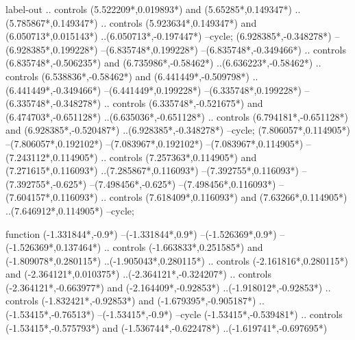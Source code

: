 {\begin{scope}[x=1mm,y=1mm,line width=\SCstroke mm,line cap=round,line join=round]
\begin{SCpart}{label-out}
.. controls ({5.522209*\SCF},{0.019893*\SCF}) and ({5.65285*\SCF},{0.149347*\SCF}) ..({5.785867*\SCF},{0.149347*\SCF})
.. controls ({5.923634*\SCF},{0.149347*\SCF}) and ({6.050713*\SCF},{0.015143*\SCF}) ..({6.050713*\SCF},{-0.197447*\SCF})
--cycle;
 ({6.928385*\SCF},{-0.348278*\SCF})
--({6.928385*\SCF},{0.199228*\SCF})
--({6.835748*\SCF},{0.199228*\SCF})
--({6.835748*\SCF},{-0.349466*\SCF})
.. controls ({6.835748*\SCF},{-0.506235*\SCF}) and ({6.735986*\SCF},{-0.58462*\SCF}) ..({6.636223*\SCF},{-0.58462*\SCF})
.. controls ({6.538836*\SCF},{-0.58462*\SCF}) and ({6.441449*\SCF},{-0.509798*\SCF}) ..({6.441449*\SCF},{-0.349466*\SCF})
--({6.441449*\SCF},{0.199228*\SCF})
--({6.335748*\SCF},{0.199228*\SCF})
--({6.335748*\SCF},{-0.348278*\SCF})
.. controls ({6.335748*\SCF},{-0.521675*\SCF}) and ({6.474703*\SCF},{-0.651128*\SCF}) ..({6.635036*\SCF},{-0.651128*\SCF})
.. controls ({6.794181*\SCF},{-0.651128*\SCF}) and ({6.928385*\SCF},{-0.520487*\SCF}) ..({6.928385*\SCF},{-0.348278*\SCF})
--cycle;
 ({7.806057*\SCF},{0.114905*\SCF})
--({7.806057*\SCF},{0.192102*\SCF})
--({7.083967*\SCF},{0.192102*\SCF})
--({7.083967*\SCF},{0.114905*\SCF})
--({7.243112*\SCF},{0.114905*\SCF})
.. controls ({7.257363*\SCF},{0.114905*\SCF}) and ({7.271615*\SCF},{0.116093*\SCF}) ..({7.285867*\SCF},{0.116093*\SCF})
--({7.392755*\SCF},{0.116093*\SCF})
--({7.392755*\SCF},{-0.625*\SCF})
--({7.498456*\SCF},{-0.625*\SCF})
--({7.498456*\SCF},{0.116093*\SCF})
--({7.604157*\SCF},{0.116093*\SCF})
.. controls ({7.618409*\SCF},{0.116093*\SCF}) and ({7.63266*\SCF},{0.114905*\SCF}) ..({7.646912*\SCF},{0.114905*\SCF})
--cycle;
\end{SCpart}
\begin{SCpart}{function}
 ({-1.331844*\SCF},{-0.9*\SCF})
--({-1.331844*\SCF},{0.9*\SCF})
--({-1.526369*\SCF},{0.9*\SCF})
--({-1.526369*\SCF},{0.137464*\SCF})
.. controls ({-1.663833*\SCF},{0.251585*\SCF}) and ({-1.809078*\SCF},{0.280115*\SCF}) ..({-1.905043*\SCF},{0.280115*\SCF})
.. controls ({-2.161816*\SCF},{0.280115*\SCF}) and ({-2.364121*\SCF},{0.010375*\SCF}) ..({-2.364121*\SCF},{-0.324207*\SCF})
.. controls ({-2.364121*\SCF},{-0.663977*\SCF}) and ({-2.164409*\SCF},{-0.92853*\SCF}) ..({-1.918012*\SCF},{-0.92853*\SCF})
.. controls ({-1.832421*\SCF},{-0.92853*\SCF}) and ({-1.679395*\SCF},{-0.905187*\SCF}) ..({-1.53415*\SCF},{-0.76513*\SCF})
--({-1.53415*\SCF},{-0.9*\SCF})
--cycle
({-1.53415*\SCF},{-0.539481*\SCF})
.. controls ({-1.53415*\SCF},{-0.575793*\SCF}) and ({-1.536744*\SCF},{-0.622478*\SCF}) ..({-1.619741*\SCF},{-0.697695*\SCF})

\end{SCpart}
\end{scope}}
